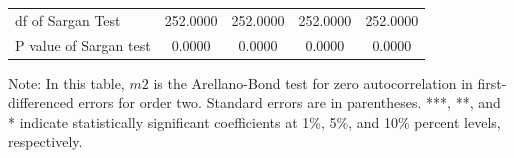 \documentclass[10pt,twoside]{article}
\begin{document}
\begin{table}[H]
\begin{threeparttable}
\begin{tabular}{l|c c| c c}
df of Sargan Test& 252.0000         & 252.0000         & 252.0000         & 252.0000         \\
P value of Sargan test&   0.0000         &   0.0000         &   0.0000         &   0.0000         \\
    \bottomrule
  \end{tabular} 
\begin{tablenotes}
\small
\item Note: In this table, $m2$ is the Arellano-Bond test for zero autocorrelation in first-differenced errors for order two. Standard errors are in parentheses. ***, **, and * indicate statistically significant coefficients at 1\%, 5\%, and 10\% percent levels, respectively.
 \end{tablenotes}
 \end{threeparttable}
\end{table}
\end{document}

